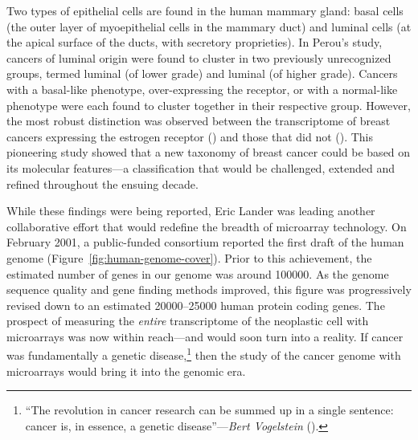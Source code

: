 Two types of epithelial cells are found in the human mammary gland: basal cells
(the outer layer of myoepithelial cells in the mammary duct) and luminal cells
(at the apical surface of the ducts, with secretory proprieties).  In Perou's
study, cancers of luminal origin were found to cluster in two previously
unrecognized groups, termed luminal  (of lower grade) and luminal
 (of higher grade).  Cancers with a \mbox{basal-like} phenotype,
\mbox{over-expressing} the  receptor, or with a normal-like
phenotype were each found to cluster together in their respective group.
However, the most robust distinction was observed between the transcriptome of
breast cancers expressing the estrogen receptor () and those that
did not ().  This pioneering study showed that a new taxonomy of
breast cancer could be based on its molecular features---a classification that
would be challenged, extended and refined throughout the ensuing
decade.\cite{sorlie_gene_2001,sorlie_repeated_2003,hu_molecular_2006,pusztai_molecular_2006,rakha_basal-like_2008,parker_supervised_2009,gusterson_basal-like_2009,weigelt_contribution_2010,prat_deconstructing_2011}


While these findings were being reported, Eric Lander was leading another
collaborative effort that would redefine the breadth of microarray technology.
On February 2001, a \mbox{public-funded} consortium reported the first draft of
the human genome (Figure~\ref{fig:human-genome-cover}).  Prior to this
achievement, the estimated number of genes in our genome was around
\num{100000}.\cite{cox_assessing_1994} As the genome sequence quality and gene
finding methods improved, this figure was progressively revised down to an
estimated \numrange{20000}{25000} human protein coding genes.  The prospect of
measuring the \emph{entire} transcriptome of the neoplastic cell with
microarrays was now within reach---and would soon turn into a reality.  If
cancer was fundamentally a genetic disease,\footnote{``The revolution in cancer
  research can be summed up in a single sentence: cancer is, in essence, a
  genetic disease''---\emph{Bert Vogelstein}
  (\citealp{vogelstein_cancer_2004}).} then the study of the cancer genome with
microarrays would bring it into the genomic era.

